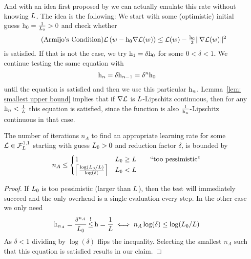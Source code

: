 And with an idea first proposed by \textcite{armijoMinimizationFunctionsHaving1966}
we can actually emulate this rate without knowing \(L\). The idea is the
following: We start with some (optimistic) initial guess \(\text{h}_0 = \tfrac{1}{L_0}>0\) and check
whether
\begin{align}
	\label{eq: armijo's condition}
	\tag{Armijo's Condition}
	\mathcal{L}\left(w - \text{h}_0\nabla\mathcal{L}(w)\right)
	\le \mathcal{L}(w) - \tfrac{\text{h}_0}{2}\|\nabla\mathcal{L}(w)\|^2
\end{align}
is satisfied. If that is not the case, we try \(\text{h}_1 = \delta\text{h}_0\)
for some \(0<\delta<1\). We continue testing the same equation with
\begin{align*}
	\text{h}_n = \delta \text{h}_{n-1} = \delta^n \text{h}_0
\end{align*}
until the equation is satisfied and then we use this particular \(\text{h}_n\).
Lemma~\ref{lem: smallest upper bound} implies that if \(\nabla\mathcal{L}\) is
\(L\)-Lipschitz continuous, then for any \(\text{h}_n < \tfrac{1}{L}\)
this equation is satisfied, since the function is also
\(\tfrac{1}{\text{h}_n}\)-Lipschitz continuous in that case.

\begin{lemma}
	The number of iterations \(n_A\) to find an appropriate learning rate for some
	\(\mathcal{L}\in\mathcal{F}^{1,1}_{L}\) starting with guess \(L_0>0\) and
	reduction factor \(\delta\), is bounded by
	\begin{align*}
		n_A \le \begin{cases}
			1 & L_0 \ge L \qquad \text{``too pessimistic''} \\
			\left\lceil \frac{\log(L_0/L)}{\log(\delta)} \right\rceil & L_0 < L
		\end{cases}
	\end{align*}
\end{lemma}
\begin{proof}
	If \(L_0\) is too pessimistic (larger than \(L\)), then the test
	will immediately succeed and the only overhead is a single evaluation every step.
	In the other case we only need
	\begin{align*}
		\lr_{n_A} = \frac{\delta^{n_A}}{\ubound_0} \xle{!} \lr = \frac{1}{\ubound}
		\iff n_A \log(\delta) \le \log(\ubound_0/\ubound)
	\end{align*}
	As \(\delta<1\) dividing by \(\log(\delta)\) flips the inequality. Selecting the
	smallest \(n_A\) such that this equation is satisfied results in our claim.
\end{proof}

